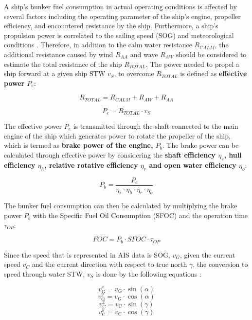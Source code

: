 \documentclass[]{interact}
\theoremstyle{plain}%
\theoremstyle{definition}
\theoremstyle{remark}
\begin{document}
A ship's bunker fuel consumption in actual operating conditions is affected by several factors including the operating parameter of the ship's engine, propeller efficiency, and encountered resistance by the ship. Furthermore, a ship's propulsion power is correlated to the sailing speed (SOG) and meteorological conditions \citep{XiaoLang.2020}. Therefore, in addition to the calm water resistance $R_{CALM}$, the additional resistance caused by wind $R_{AA}$ and wave $R_{AW}$ should be considered to estimate the total resistance of the ship $R_{TOTAL}$. The power needed to propel a ship forward at a given ship STW $v_S$, to overcome $R_{TOTAL}$ is defined as \textbf{effective power $P_e$}:

\begin{equation}\label{eqn:R_tot}
    R_{TOTAL} = R_{CALM} + R_{AW} + R_{AA} 
\end{equation}

\begin{equation}\label{eqn:P_e}
    P_e = R_{TOTAL}\cdot v_{S}
\end{equation}

The effective power $P_e$ is transmitted through the shaft connected to the main engine of the ship which generates power to rotate the propeller of the ship, which is termed as \textbf{brake power of the engine, $P_b$}. The brake power can be calculated through effective power by considering the \textbf{shaft efficiency $\eta_s$, hull efficiency $\eta_h$, relative rotative efficiency $\eta_r$ and open water efficiency $\eta_o$}:

\begin{equation}\label{eqn:P_b}
    P_b = \frac{P_e}{\eta_s\cdot\eta_h\cdot\eta_r\cdot\eta_o}
\end{equation}

The bunker fuel consumption can then be calculated by multiplying the brake power $P_b$ with the Specific Fuel Oil Consumption (SFOC) and the operation time $\tau_{OP}$:

\begin{equation}\label{eqn:FOC}
    FOC = P_b\cdot SFOC\cdot \tau_{OP} 
\end{equation}

Since the speed that is represented in AIS data is SOG, $v_G$, given the current speed $v_C$ and the current direction with respect to true north $\gamma$, the conversion to speed through water STW, $v_S$ is done by the following equations \citep{Kim.2020b}:

\begin{equation}\label{eqn:sogx}
  v_{\text{G}}^x = v_{\text{G}}\cdot\sin(\alpha)   
\end{equation}
\begin{equation}\label{eqn:sogy}
  v_{\text{G}}^y = v_{\text{G}}\cdot\cos(\alpha)   
\end{equation} 
\begin{equation}\label{eqn:vcurrx}
   v_{\text{C}}^x = v_{\text{C}}\cdot\sin(\gamma)   
\end{equation}
\begin{equation}\label{eqn:vcurry}
  v_{\text{C}}^y = v_{\text{C}}\cdot\cos(\gamma)   
\end{equation}
\end{document}
